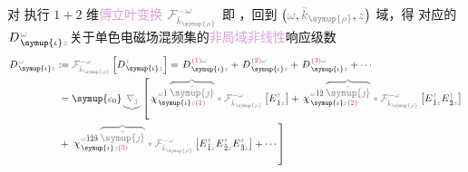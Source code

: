 对  执行 $1+2$ 维\textcolor{Plum}{傅立叶变换} $\mathcolor{gray}{\mathcal F_{\bar{k}_{\symup{\rho}}}^{-\omega}}$ 即 ，回到 $\left( \mathcolor{gray}{\omega}, \mathcolor{gray}{\bar{k}_{\symup{\rho}}}, \mathcolor{gray}{z} \right)$ 域，得  对应的 $\Xint{\mathcolor{gray}{-}}{255}{D}^{\;\!\mathcolor{gray}{\omega}}_{\;\! \symup{\iota}\mathcolor{gray}{z}}$关于单色电磁场混频集的\textcolor{Plum}{非局域}\textcolor{Plum}{非线性}响应级数
\begin{subequations}
	\abovedisplayskip=6pt
	\belowdisplayskip=6pt
\begin{align}
	\Xint{\mathcolor{gray}{-}}{30}{D}^{\;\!\mathcolor{gray}{\omega}}_{\;\! \symup{\iota}\mathcolor{gray}{z}} &:= \mathcolor{gray}{\mathcal F_{\bar{k}_{\symup{\rho}}}^{-\omega}} \left[ D^{\;\! \mathcolor{gray}{t}}_{\;\! \symup{\iota}\mathcolor{gray}{z}} \right] = \Xint{\mathcolor{gray}{-}}{30}{D}^{\;\! \textcolor{Maroon}{(1)} \mathcolor{gray}{\omega}}_{\;\! \symup{\iota}\mathcolor{gray}{z}} + \Xint{\mathcolor{gray}{-}}{30}{D}^{\;\! \textcolor{Maroon}{(2)} \mathcolor{gray}{\omega}}_{\;\! \symup{\iota}\mathcolor{gray}{z}} + \Xint{\mathcolor{gray}{-}}{30}{D}^{\;\! \textcolor{Maroon}{(3)} \mathcolor{gray}{\omega}}_{\;\! \symup{\iota}\mathcolor{gray}{z}} + \cdots \\ &\hphantom{:}= {\symup{\varepsilon_0}} \mathcolor{gray}{\underbrace{\nabla_{\check{\jmath}}}} \left[ \Xint{{}^{}_{\mathcolor{gray}{-}}}{23}{\chi}^{\;\! \mathcolor{gray}{\omega} \hat{1} \;\! \mathcolor{gray}{\overbrace{\check{\symup{\jmath}}}}}_{\;\! \symup{\iota} \mathcolor{gray}{z} \textcolor{Maroon}{(1)}} \mathcolor{gray}{*} \mathcolor{gray}{\mathcal F_{\bar{k}_{\symup{\rho}}}^{-\omega}} \left[ E^{\;\!\mathcolor{gray}{t}}_{\;\! \hat{1} \mathcolor{gray}{z}} \right] + \Xint{{}^{}_{\mathcolor{gray}{-}}}{23}{\chi}^{\;\! \mathcolor{gray}{\omega} \hat{1} \hat{2} \;\! \mathcolor{gray}{\overbrace{\check{\symup{\jmath}}}}}_{\;\! \symup{\iota} \mathcolor{gray}{z} \textcolor{Maroon}{(2)}} \mathcolor{gray}{*} \mathcolor{gray}{\mathcal F_{\bar{k}_{\symup{\rho}}}^{-\omega}} \left[ E^{\;\!\mathcolor{gray}{t}}_{\;\! \hat{1} \mathcolor{gray}{z}} E^{\;\!\mathcolor{gray}{t}}_{\;\! \hat{2} \mathcolor{gray}{z}} \right] \right. \label{eq:D_wkrho} \\ &\hphantom{:}+ \left. \Xint{{}^{}_{\mathcolor{gray}{-}}}{23}{\chi}^{\;\! \mathcolor{gray}{\omega} \hat{1} \hat{2} \hat{3} \;\! \mathcolor{gray}{\overbrace{\check{\symup{\jmath}}}}}_{\;\! \symup{\iota} \mathcolor{gray}{z} \textcolor{Maroon}{(3)}} \mathcolor{gray}{*} \mathcolor{gray}{\mathcal F_{\bar{k}_{\symup{\rho}}}^{-\omega}} \left[ E^{\;\!\mathcolor{gray}{t}}_{\;\! \hat{1} \mathcolor{gray}{z}} E^{\;\!\mathcolor{gray}{t}}_{\;\! \hat{2} \mathcolor{gray}{z}} E^{\;\!\mathcolor{gray}{t}}_{\;\! \hat{3} \mathcolor{gray}{z}} \right] + \cdots \right]

\end{align}
\end{subequations}
